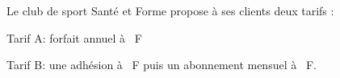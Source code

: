 
\medskip

Le club de sport \og Santé et Forme \fg{} propose à ses clients deux
tarifs :

Tarif A: forfait annuel à ~F

Tarif B: une adhésion à ~F puis un abonnement mensuel à
~F.
%
%
%
%
%
%
%
%
%
%
%
%
